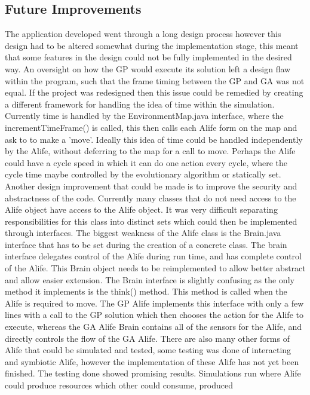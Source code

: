 \documentclass[12pt]{article}
\begin{document}
\subsection{Future Improvements}
The application developed went through a long design process however this design had to be altered somewhat during the implementation stage, this meant that some
features in the design could not be fully implemented in the desired way. An oversight on how the GP would execute its solution left a design flaw within the program,
such that the frame timing between the GP and GA was not equal. If the project was redesigned then this issue could be remedied by creating a different framework for
handling the idea of time within the simulation. Currently time is handled by the EnvironmentMap.java interface, where the incrementTimeFrame() is called, this then
calls each Alife form on the map and ask to to make a 'move'. Ideally this idea of time could be handled independently by the Alife, without deferring to the map for
a call to move. Perhaps the Alife could have a cycle speed in which it can do one action every cycle, where the cycle time maybe controlled by the evolutionary algorithm
or statically set. 
Another design improvement that could be made is to improve the security and abstractness of the code. Currently many classes that do not need access to the Alife
object have access to the Alife object. It was very difficult separating responsibilities for this class into distinct sets which could then be implemented through
interfaces. The biggest weakness of the Alife class is the Brain.java interface that has to be set during the creation of a concrete class. The brain interface
delegates control of the Alife during run time, and has complete control of the Alife. This Brain object needs to be reimplemented to allow better abstract and allow
easier extension. The Brain interface is slightly confusing as the only method it implements is the think() method. This method is called when the Alife is required to
move. The GP Alife implements this interface with only a few lines with a call to the GP solution which then chooses the action for the Alife to execute, whereas the
GA Alife Brain contains all of the sensors for the Alife, and directly controls the flow of the GA Alife.
There are also many other forms of Alife that could be simulated and tested, some testing was done of interacting and symbiotic Alife, however the implementation of
these Alife has not yet been finished. The testing done showed promising results. Simulations run where Alife could produce resources which other could consume, produced
\end{document}
